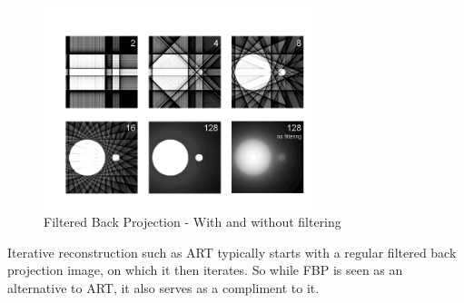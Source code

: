 \begin{figure}[H]
    \centering
    \includegraphics[width=0.7\textwidth]{figures/fbp.png}
    \caption{Filtered Back Projection - With and without filtering\cite{PICTURE}}
    \label{fig:fbp}
\end{figure}
Iterative reconstruction such as ART typically starts with a regular filtered back projection image, on which it then iterates. So while FBP is seen as an alternative to ART, it also serves as a compliment to it. 